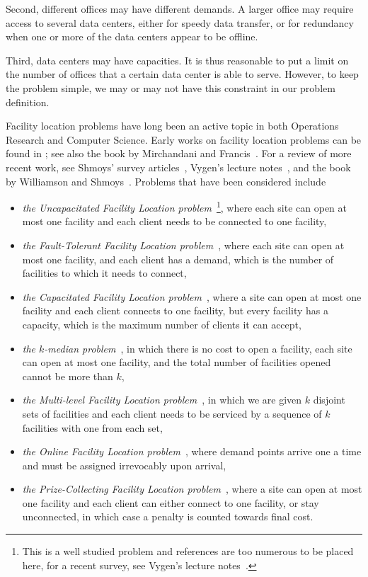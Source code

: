 \documentclass[oneside,final]{ucr}
\begin{document}
Second, different offices may have different demands. A
larger office may require access to several data centers,
either for speedy data transfer, or for redundancy when one
or more of the data centers appear to be offline.

Third, data centers may have capacities. It is thus
reasonable to put a limit on the number of offices that a
certain data center is able to serve. However, to keep the
problem simple, we may or may not have this constraint in
our problem definition.

Facility location problems have long been an active topic in
both Operations Research and Computer Science. Early works
on facility location problems can be found in
\cite{KuehnH63,Man64,Bal66}; see also the book by
Mirchandani and Francis~\cite{MirF90}. For a review of more
recent work, see Shmoys' survey
articles~\cite{Shmoys00,Shmoys04}, Vygen's lecture
notes~\cite{Vygen05}, and the book by Williamson and
Shmoys~\cite{WilliamsonS11}. Problems that have been
considered include
\begin{itemize}
\item \emph{the Uncapacitated Facility Location
    problem}~\footnote{This is a well studied problem and
    references are too numerous to be placed here, for a
    recent survey, see Vygen's lecture
    notes~\cite{Vygen05}.}, where each site can open at most
  one facility and each client needs to be connected to one
  facility,
\item \emph{the Fault-Tolerant Facility Location
    problem}~\cite{JainV03,GuhaMM03,ByrkaSS10}, where each
  site can open at most one facility, and each client has a
  demand, which is the number of facilities to which it
  needs to connect,
\item \emph{the Capacitated Facility Location
    problem}~\cite{ShmoysTA97,MahdianYZ06,PalTW01,ZhangCY05},
  where a site can open at most one facility and each client
  connects to one facility, but every facility has a
  capacity, which is the maximum number of clients it can
  accept,
\item \emph{the $k$-median
    problem}~\cite{CharikarGTS02,JainV01,AryaGKMMP04,CharikarL12},
  in which there is no cost to open a facility, each site
  can open at most one facility, and the total number of
  facilities opened cannot be more than $k$,
\item \emph{the Multi-level Facility Location
    problem}~\cite{AardalMLQ96,AardalCS99,Zhang06,ByrkaR12,KrishnaswamyS12},
  in which we are given $k$ disjoint sets of facilities and
  each client needs to be serviced by a sequence of $k$
  facilities with one from each set,
\item \emph{the Online Facility Location
    problem}~\cite{Meyerson01, Fotakis07, Fotakis08}, where demand points
  arrive one a time and must be assigned irrevocably upon
  arrival,
\item \emph{the Prize-Collecting Facility Location
    problem}~\cite{CharikarKMN01}, where a site can open at
  most one facility and each client can either connect to
  one facility, or stay unconnected, in which case a penalty
  is counted towards final cost.
\end{itemize}
\end{document}
